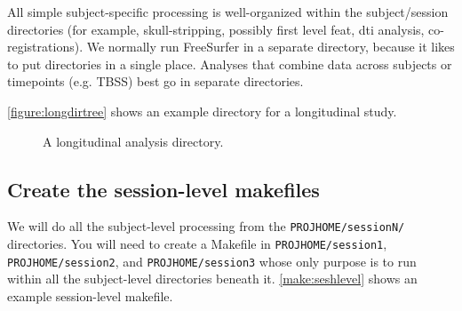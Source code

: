 All simple subject-specific processing is well-organized within the subject/session directories (for example, skull-stripping, possibly first level feat, dti analysis, co-registrations). We normally run FreeSurfer in a separate directory, because it likes to put directories in a single place. Analyses that combine data across subjects or timepoints (e.g. TBSS) best go in separate directories.

\autoref{figure:longdirtree} shows an example directory for a longitudinal study.

\begin{center}
	\begin{figure}
	\caption{A longitudinal analysis directory.}
	\end{figure}
	\label{figure:longdirtree}
\end{center}

\subsection{Create the session-level makefiles}
We will do all the subject-level processing from the \texttt{PROJHOME/sessionN/} directories. You will need to create a Makefile in \texttt{PROJHOME/session1}, \texttt{PROJHOME/session2}, and \texttt{PROJHOME/session3} whose only purpose is to run \maken{} within all the subject-level directories beneath it. 
\autoref{make:seshlevel} shows an example session-level makefile.


